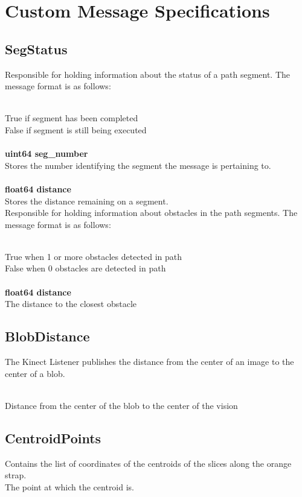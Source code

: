 \section{Custom Message Specifications}

\subsection{SegStatus}

Responsible for holding information about the status of a path
segment.  The message format is as follows:

\\
\indent True if segment has been completed\\
\indent False if segment is still being executed\\
\\
{\bf uint64 seg\_number}\\
\indent Stores the number identifying the segment the message is
pertaining to.\\
\\
{\bf float64 distance}\\
\indent Stores the distance remaining on a segment.\\


Responsible for holding information about obstacles in the path
segments.  The message format is as follows:

\\
\indent True when 1 or more obstacles detected in path\\
\indent False when 0 obstacles are detected in path\\
\\
{\bf float64 distance}\\
\indent The distance to the closest obstacle

\subsection{BlobDistance}
The Kinect Listener publishes the distance from the center of an image
to the center of a blob.

\\
\indent Distance from the center of the blob to the center of the vision\\

\subsection{CentroidPoints}
Contains the list of coordinates of the centroids of the slices along the orange strap.
\\
\indent {}
\indent The point at which the centroid is.

